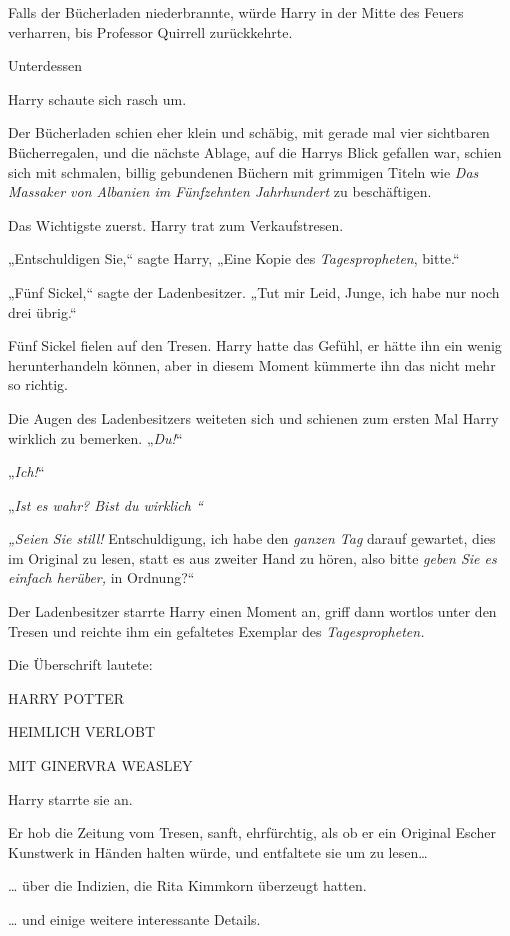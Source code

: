 {Falls der Bücherladen niederbrannte, würde Harry in der Mitte des Feuers verharren, bis Professor Quirrell zurückkehrte.

Unterdessen \later

Harry schaute sich rasch um.

Der Bücherladen schien eher klein und schäbig, mit gerade mal vier sichtbaren Bücherregalen, und die nächste Ablage, auf die Harrys Blick gefallen war, schien sich mit schmalen, billig gebundenen Büchern mit grimmigen Titeln wie \emph{Das Massaker von Albanien im Fünfzehnten Jahrhundert} zu beschäftigen.

Das Wichtigste zuerst. Harry trat zum Verkaufstresen.

„Entschuldigen Sie,“ sagte Harry, „Eine Kopie des \emph{Tagespropheten}, bitte.“

„Fünf Sickel,“ sagte der Ladenbesitzer. „Tut mir Leid, Junge, ich habe nur noch drei übrig.“

Fünf Sickel fielen auf den Tresen. Harry hatte das Gefühl, er hätte ihn ein wenig herunterhandeln können, aber in diesem Moment kümmerte ihn das nicht mehr so richtig.

Die Augen des Ladenbesitzers weiteten sich und schienen zum ersten Mal Harry wirklich zu bemerken. „\emph{Du!}“

„\emph{Ich!}“

„\emph{Ist es wahr? Bist du wirklich \later“}

\emph{„Seien Sie still!} Entschuldigung, ich habe den \emph{ganzen Tag} darauf gewartet, dies im Original zu lesen, statt es aus zweiter Hand zu hören, also bitte \emph{geben Sie es einfach herüber,} in Ordnung?“

Der Ladenbesitzer starrte Harry einen Moment an, griff dann wortlos unter den Tresen und reichte ihm ein gefaltetes Exemplar des \emph{Tagespropheten.}

Die Überschrift lautete:

HARRY POTTER

HEIMLICH VERLOBT

MIT GINERVRA WEASLEY

Harry starrte sie an.

Er hob die Zeitung vom Tresen, sanft, ehrfürchtig, als ob er ein Original Escher Kunstwerk in Händen halten würde, und entfaltete sie um zu lesen…

… über die Indizien, die Rita Kimmkorn überzeugt hatten.

… und einige weitere interessante Details.

}
